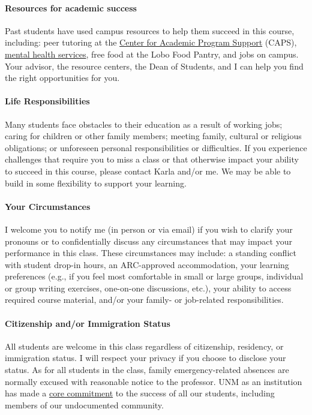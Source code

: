 \documentclass[11pt]{article}
\begin{document}
\paragraph{Resources for academic success} Past students have used campus resources to help them succeed in this course, including: peer tutoring at the \href{https://caps.unm.edu/}{Center for Academic Program Support} (CAPS),  \href{http://mentalhealth.unm.edu}{mental health services}, free food at the Lobo Food Pantry, and jobs on campus. Your advisor, the resource centers, the Dean of Students, and I can help you find the right opportunities for you.

\paragraph{Life Responsibilities} %
Many students face obstacles to their education as a result of working jobs; caring for children or other family members; meeting family, cultural or religious obligations; or unforeseen personal responsibilities or difficulties. If you experience challenges that require you to miss a class or that otherwise impact your ability to succeed in this course, please contact Karla and/or me. We may be able to build in some flexibility to support your learning.

\paragraph{Your Circumstances} I welcome you to notify me (in person or via email) if you wish to clarify your pronouns or to confidentially discuss any circumstances that may impact your performance in this class. These circumstances may include: a standing conflict with student drop-in hours, an ARC-approved accommodation, your learning preferences (e.g., if you feel most comfortable in small or large groups, individual or group writing exercises, one-on-one discussions, etc.), your ability to access required course material, and/or your family- or job-related responsibilities.

\paragraph{Citizenship and/or Immigration Status} All students are welcome in this class regardless of citizenship, residency, or immigration status. I will respect your privacy if you choose to disclose your status. As for all students in the class, family emergency-related absences are normally excused with reasonable notice to the professor. UNM as an institution has made a \href{http://undocumented.unm.edu/}{core commitment} to the success of all our students, including members of our undocumented community.
\end{document}
